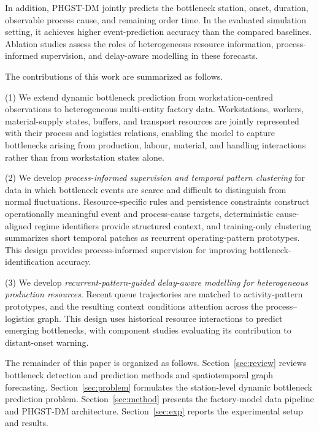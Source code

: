 \documentclass[a4paper,fleqn]{cas-dc}
\begin{document}
In addition, PHGST-DM jointly predicts the bottleneck station, onset, duration, observable process cause, and remaining order time. In the evaluated simulation setting, it achieves higher event-prediction accuracy than the compared baselines. Ablation studies assess the roles of heterogeneous resource information, process-informed supervision, and delay-aware modelling in these forecasts.

The contributions of this work are summarized as follows.

(1) We extend dynamic bottleneck prediction from workstation-centred observations to heterogeneous multi-entity factory data. Workstations, workers, material-supply states, buffers, and transport resources are jointly represented with their process and logistics relations, enabling the model to capture bottlenecks arising from production, labour, material, and handling interactions rather than from workstation states alone.

(2) We develop \emph{process-informed supervision and temporal pattern clustering} for data in which bottleneck events are scarce and difficult to distinguish from normal fluctuations. Resource-specific rules and persistence constraints construct operationally meaningful event and process-cause targets, deterministic cause-aligned regime identifiers provide structured context, and training-only clustering summarizes short temporal patches as recurrent operating-pattern prototypes. This design provides process-informed supervision for improving bottleneck-identification accuracy.

(3) We develop \emph{recurrent-pattern-guided delay-aware modelling for heterogeneous production resources}. Recent queue trajectories are matched to activity-pattern prototypes, and the resulting context conditions attention across the process--logistics graph. This design uses historical resource interactions to predict emerging bottlenecks, with component studies evaluating its contribution to distant-onset warning.

The remainder of this paper is organized as follows. Section~\ref{sec:review} reviews bottleneck detection and prediction methods and spatiotemporal graph forecasting. Section~\ref{sec:problem} formulates the station-level dynamic bottleneck prediction problem. Section~\ref{sec:method} presents the factory-model data pipeline and PHGST-DM architecture. Section~\ref{sec:exp} reports the experimental setup and results.

\end{document}
